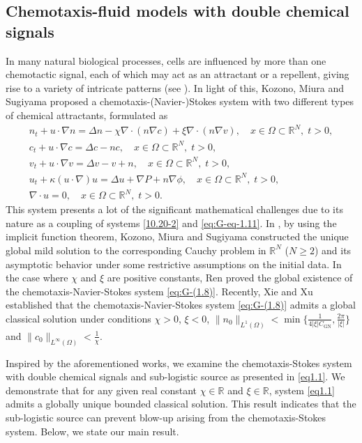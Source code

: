 \documentclass[10pt,a4paper]{amsart}
\numberwithin{equation}{section}
\begin{document}
\subsection*{Chemotaxis-fluid models with double chemical signals} 
In many natural biological processes, cells are influenced by more than one chemotactic
signal, each of which may act as an attractant or a repellent, giving rise to a 
variety of intricate patterns (see \cite{Painter}). In light of this,
Kozono,  Miura and Sugiyama \cite{kozono} proposed a chemotaxis-(Navier-)Stokes 
system with two different types of chemical attractants, formulated as 
\begin{equation}\label{eq:G-(1.8)}
\begin{gathered}
n_t + u \cdot \nabla n = \Delta n - \chi \nabla \cdot (n\nabla c) 
 + \xi \nabla \cdot (n\nabla v), \quad x \in \Omega\subset \mathbb{R}^N,\; t > 0, \\
c_t + u \cdot \nabla c = \Delta c - nc, \quad
 x \in \Omega\subset \mathbb{R}^N,\; t > 0, \\
v_t + u \cdot \nabla v= \Delta v - v + n, \quad
 x \in \Omega\subset \mathbb{R}^N,\; t > 0, \\
u_t + \kappa (u \cdot \nabla) u  = \Delta u + \nabla P + n\nabla \phi,  \quad
 x \in \Omega\subset \mathbb{R}^N,\; t > 0, \\
\nabla \cdot u = 0,  \quad x \in \Omega\subset \mathbb{R}^N,\; t > 0.
\end{gathered}
\end{equation}
This system presents a lot of the significant mathematical challenges due to its 
nature as a coupling of systems \eqref{10.20-2} and \eqref{eq:G-eq-1.11}. 
In \cite{kozono}, by using the implicit function theorem, Kozono,  Miura and Sugiyama 
constructed the unique global mild solution to the corresponding Cauchy problem in
$\mathbb{R}^N$ ($N \geq 2$) and its asymptotic behavior under some restrictive 
assumptions on the initial data. In the case where $\chi$ and $\xi$ are
positive constants, Ren \cite{G-35} proved the global existence of the 
chemotaxis-Navier-Stokes system \eqref{eq:G-(1.8)}. Recently, Xie and Xu
\cite{Global-1} established that the chemotaxis-Navier-Stokes system 
\eqref{eq:G-(1.8)} admits a global classical solution under
conditions $ \chi > 0$, $ \xi < 0$, 
$\|n_0\|_{L^1(\Omega)} < \min \{ \frac{1}{4| \xi | C_{\mathrm{GN}}}, 
\frac{2\pi}{ |\xi| } \}$ and
$\|c_0\|_{L^\infty(\Omega)} < \frac{1}{\chi}$. 

Inspired by the aforementioned works, we examine the chemotaxis-Stokes system 
with double chemical signals and sub-logistic source as
presented in \eqref{eq1.1}. We demonstrate that for any given real constant 
$ \chi \in \mathbb{R}$ and $ \xi\in \mathbb{R}$, system \eqref{eq1.1} admits a 
globally unique bounded classical solution. 
This result indicates that the sub-logistic source can prevent blow-up arising 
from the chemotaxis-Stokes system. Below, we state our main result.
\end{document}
